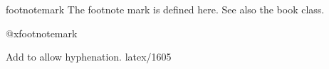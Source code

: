  \begin{docCommand}{footnotemark}{}
  The footnote mark is defined here. See also the book class.
 \end{docCommand}
    \begin{teX}
\def\footnotemark{%
   \@ifnextchar[\@xfootnotemark
     {\stepcounter{footnote}%
      \protected@xdef\@thefnmark{\thefootnote}%
      \@footnotemark}}
    \end{teX}
 

 \begin{docCommand}{@xfootnotemark}{}
    \begin{teX}
\def\@xfootnotemark[#1]{%
   \begingroup 
      \c@footnote #1\relax
      \unrestored@protected@xdef\@thefnmark{\thefootnote}%
   \endgroup
   \@footnotemark}
    \end{teX}
 \end{docCommand}

 \begin{macro}{\@footnotemark}

 {Add  to allow hyphenation. latex/1605}
    \begin{teX}
\def\@footnotemark{%
  \leavevmode
  \ifhmode\edef\@x@sf{\the\spacefactor}\nobreak\fi
  \@makefnmark
  \ifhmode\spacefactor\@x@sf\fi
  \relax}
    \end{teX}
 \end{macro}

 \begin{macro}{\footnotetext}
    \begin{teX}
\def\footnotetext{%
     \@ifnextchar [\@xfootnotenext
       {\protected@xdef\@thefnmark{\thempfn}%
    \@footnotetext}}
    \end{teX}
 \end{macro}

 \begin{macro}{\@xfootnotenext}
    \begin{teX}
\def\@xfootnotenext[#1]{%
  \begingroup 
     \csname c@\@mpfn\endcsname #1\relax
     \unrestored@protected@xdef\@thefnmark{\thempfn}%
  \endgroup
  \@footnotetext}
    \end{teX}
 \end{macro}

 \begin{macro}{\thempfn}
 \begin{macro}{\@mpfn}
    \begin{teX}
\def\@mpfn{footnote}
\def\thempfn{\thefootnote}

    \end{teX}
 \end{macro}
 \end{macro}

